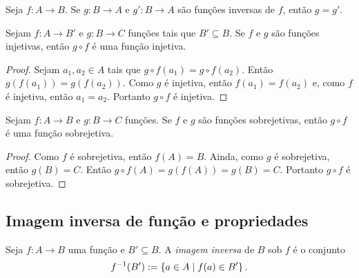 \begin{proposition}
	Seja $f\colon A \to B$. Se $g\colon B \to A$ e $g'\colon B \to A$ são funções inversas de $f$, então $g=g'$.
\end{proposition}
	

\begin{proposition}
\label{prop:comp.func.inj}
	Sejam $f\colon A \to B'$ e $g\colon B \to C$ funções tais que $B' \subseteq B$. Se $f$ e $g$ são funções injetivas, então $g \circ f$ é uma função injetiva.
\end{proposition}
\begin{proof}
	Sejam $a_1,a_2 \in A$ tais que $g \circ f(a_1)=g \circ f(a_2)$. Então $g(f(a_1))=g(f(a_2))$. Como $g$ é injetiva, então $f(a_1)=f(a_2)$ e, como $f$ é injetiva, então $a_1=a_2$. Portanto $g \circ f$ é injetiva.
\end{proof}

\begin{proposition}
\label{prop:comp.func.sobr}
	Sejam $f\colon A \to B$ e $g\colon B \to C$ funções. Se $f$ e $g$ são funções sobrejetivas, então $g \circ f$ é uma função sobrejetiva.
\end{proposition}
\begin{proof}
	Como $f$ é sobrejetiva, então $f(A)=B$. Ainda, como $g$ é sobrejetiva, então $g(B)=C$. Então $g \circ f(A) = g(f(A))=g(B)=C$. Portanto $g \circ f$ é sobrejetiva.
\end{proof}

\subsection{Imagem inversa de função e propriedades}

\begin{definition}
	Seja $f: A \to B$ uma função e $B' \subseteq B$. A \emph{imagem inversa} de $B$ sob $f$ é o conjunto
	\begin{equation*}
	f^{-1}(B') := \left\{{a \in A}\;\middle\vert\;{f(a) \in B'}\right\}.
	\end{equation*}
\end{definition}

